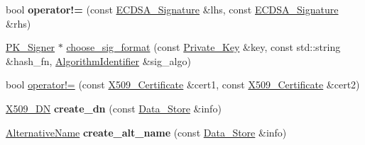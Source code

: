 \begin{DoxyCompactItemize}
\item 
\hypertarget{namespaceBotan_a0d33e043baf97f91f1d8bf1ab8bdf31c}{bool {\bfseries operator!=} (const \hyperlink{classBotan_1_1ECDSA__Signature}{E\-C\-D\-S\-A\-\_\-\-Signature} \&lhs, const \hyperlink{classBotan_1_1ECDSA__Signature}{E\-C\-D\-S\-A\-\_\-\-Signature} \&rhs)}\label{namespaceBotan_a0d33e043baf97f91f1d8bf1ab8bdf31c}

\item 
\hyperlink{classBotan_1_1PK__Signer}{P\-K\-\_\-\-Signer} $\ast$ \hyperlink{namespaceBotan_a4ad323a32ff416ab3582aeea286bed2a}{choose\-\_\-sig\-\_\-format} (const \hyperlink{classBotan_1_1Private__Key}{Private\-\_\-\-Key} \&key, const std\-::string \&hash\-\_\-fn, \hyperlink{classBotan_1_1AlgorithmIdentifier}{Algorithm\-Identifier} \&sig\-\_\-algo)
\item 
bool \hyperlink{namespaceBotan_ab766e2bc3a91f97f9ad03e981ddc5a13}{operator!=} (const \hyperlink{classBotan_1_1X509__Certificate}{X509\-\_\-\-Certificate} \&cert1, const \hyperlink{classBotan_1_1X509__Certificate}{X509\-\_\-\-Certificate} \&cert2)
\item 
\hypertarget{namespaceBotan_afa206864eb2cd0497a875cadc4d5381a}{\hyperlink{classBotan_1_1X509__DN}{X509\-\_\-\-D\-N} {\bfseries create\-\_\-dn} (const \hyperlink{classBotan_1_1Data__Store}{Data\-\_\-\-Store} \&info)}\label{namespaceBotan_afa206864eb2cd0497a875cadc4d5381a}

\item 
\hypertarget{namespaceBotan_afe87b8cc64bd550662566d30601cf0bf}{\hyperlink{classBotan_1_1AlternativeName}{Alternative\-Name} {\bfseries create\-\_\-alt\-\_\-name} (const \hyperlink{classBotan_1_1Data__Store}{Data\-\_\-\-Store} \&info)}\label{namespaceBotan_afe87b8cc64bd550662566d30601cf0bf}


\end{DoxyCompactItemize}
